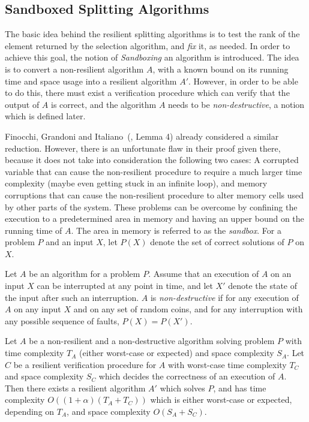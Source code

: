 \documentclass{llncs}
\begin{document}
\subsection{Sandboxed Splitting Algorithms}
\label{sandboxed_splitting_algorithms}

The basic idea behind the resilient splitting algorithms is to test the rank of the element returned by the selection algorithm, and \emph{fix} it, as needed. In order to achieve this goal, the notion of \emph{Sandboxing} an algorithm is introduced. The idea is to convert a non-resilient algorithm $A$, with a known bound on its running time and space usage into a resilient algorithm $A'$. However, in order to be able to do this, there must exist a verification procedure which can verify that the output of $A$ is correct, and the algorithm $A$ needs to be \emph{non-destructive}, a notion which is defined later.

Finocchi, Grandoni and Italiano~(\cite{resilient_dictionaries}, Lemma 4) already considered a similar reduction. However, there is an unfortunate flaw in their proof given there, because it does not take into consideration the following two cases: A corrupted variable that can cause the non-resilient procedure to require a much larger time complexity (maybe even getting stuck in an infinite loop), and memory corruptions that can cause the non-resilient procedure to alter memory cells used by other parts of the system. These problems can be overcome by confining the execution to a predetermined area in memory and having an upper bound on the running time of $A$. The area in memory is referred to as the \emph{sandbox}. For a problem $P$ and an input $X$, let $P(X)$ denote the set of correct solutions of $P$ on $X$.

\begin{definition}
Let $A$ be an algorithm for a problem $P$. Assume that an execution of $A$ on an input $X$ can be interrupted at any point in time, and let $X'$ denote the state of the input after such an interruption. $A$ is \emph{non-destructive} if for any execution of $A$ on any input $X$ and on any set of random coins, and for any interruption with any possible sequence of faults, $P(X) = P(X')$.
\end{definition}

\begin{lemma}
\label{lem:sandbox_lemma}
Let $A$ be a non-resilient and a non-destructive algorithm solving problem $P$ with time complexity $T_A$ (either worst-case or expected) and space complexity $S_A$. Let $C$ be a resilient verification procedure for $A$ with worst-case time complexity $T_C$ and space complexity $S_C$ which decides the correctness of an execution of $A$.
Then there exists a resilient algorithm $A'$ which solves $P$, and has time complexity $O((1 + \alpha)(T_A + T_C))$ which is either worst-case or expected, depending on $T_A$, and space complexity $O(S_A + S_C)$.
\end{lemma}
\end{document}
